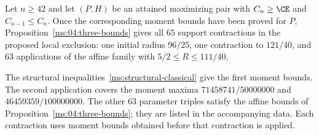 \begin{theorem}\label{ms:04:replacement}
Let $n\ge42$ and let $(P,H)$ be an attained maximizing pair with
$C_n\ge\CE$ and $C_{n-1}\le C_n$. Once the corresponding moment bounds
have been proved for $P$, Proposition~\ref{ms:04:three-bounds} gives all
$65$ support contractions in the proposed local exclusion: one initial
radius $96/25$, one contraction to $121/40$, and $63$ applications of the
affine family with $5/2\le R\le111/40$.
\end{theorem}
The structural inequalities~\eqref{ms:structural-classical} give the
first moment bounds. The second application covers the moment maxima
$71458741/50000000$ and $46459359/100000000$. The other $63$ parameter
triples satisfy the affine bounds of Proposition~\ref{ms:04:three-bounds};
they are listed in the accompanying data. Each contraction uses moment
bounds obtained before that contraction is applied.
